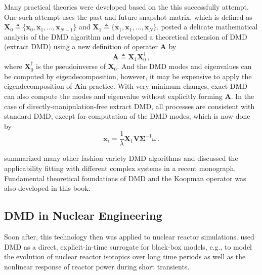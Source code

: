 Many practical theories were developed based on the this successfully attempt.
One such attempt uses the past and future snapshot matrix, which is defined as $\mathbf{X}_0 \triangleq \{\mathbf{x}_0, \mathbf{x}_1, \ldots, \mathbf{x}_{N-1} \}$ and $\mathbf{X}_1 \triangleq \{\mathbf{x}_1, \mathbf{x}_1, \ldots, \mathbf{x}_{N} \} $. 
\citet{tu_dynamic_2014} posted a delicate mathematical analysis of the DMD algorithm and developed a theoretical extension of DMD (extract DMD) using a new definition of operater $\mathbf{A}$ by    
\begin{equation}
 \mathbf{A}\triangleq \mathbf{X}_1  \mathbf{X}_0^{\dagger}\, ,
 \label{eq:exact_dmd}
\end{equation}
where $\mathbf{X}_0^{\dagger}$ is the pseudoinverse of $\mathbf{X}_0$. 
And the DMD modes and eigenvalues can be computed by eigendecomposition, however, it may be expensive to apply the eigendecomposition of $\mathbf{A}$in practice.
With very minimum changes, exact DMD can also compute the modes and eigenvalue without explicitly forming $\mathbf{A}$.
In the case of directly-manipulation-free extract DMD, all processes are consistent with standard DMD, except for computation of the DMD modes, which is now done by
\begin{equation}
 \mathbf{\mathbf{x}}_i = \frac{1}{\lambda} \mathbf{X}_1 \mathbf{V} \mathbf{\Sigma}^{-1} \omega \, .
 \label{eq:exact_dmd_free}
\end{equation}

\citet{kutz_dynamic_2016} summarized many other fashion variety DMD algorithms and discussed the applicability fitting with different complex systems in a recent monograph.
Fundamental theoretical foundations of DMD and the Koopman operator was also developed in this book.

\subsection{DMD in Nuclear Engineering}
Soon after, this technology then was applied to nuclear reactor simulations. 
\citet{abdo_data-driven_2018} used DMD as a direct, explicit-in-time surrogate for black-box models, e.g., to model the evolution of nuclear reactor isotopics over long time periods as well as the nonlinear response of reactor power during short transients.\cite{abdo_modeling_2019}\cite{elzohery2018comparison}

